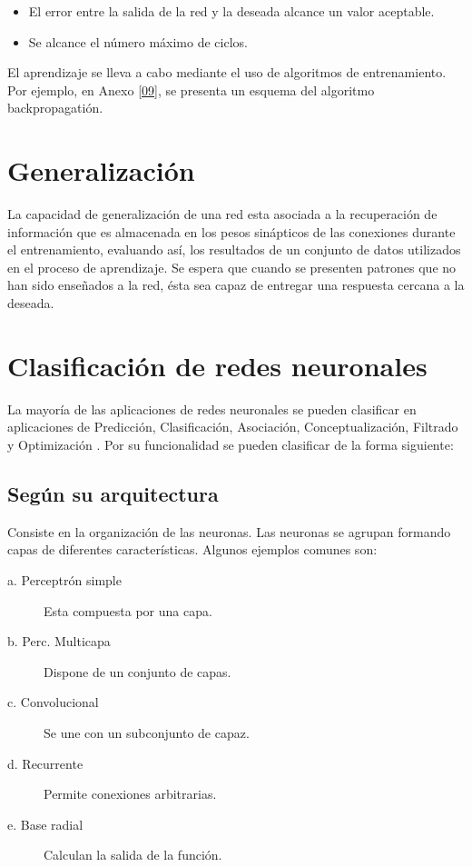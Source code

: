 \documentclass[11pt,titlepage]{report}
\begin{document}
\begin{itemize}
	\item El error entre la salida de la red y la deseada alcance un valor aceptable.
	\item  Se alcance el número máximo de ciclos.
\end{itemize}
	
El aprendizaje se lleva a cabo mediante el uso de algoritmos de entrenamiento. Por ejemplo, en Anexo \ref{09}, se presenta un esquema del algoritmo backpropagatión.


\section{Generalización}
La capacidad de generalización de una red esta asociada a la recuperación de información que es almacenada en los pesos sinápticos de las conexiones durante el entrenamiento, evaluando así, los resultados de un conjunto de datos utilizados en el proceso de aprendizaje. Se espera que cuando se presenten patrones que no han sido enseñados a la red, ésta sea capaz de entregar una respuesta cercana a la deseada. 

\section{Clasificación de redes neuronales}
La mayoría de las aplicaciones de redes neuronales se pueden clasificar en aplicaciones de Predicción, Clasificación, Asociación, Conceptualización, Filtrado y Optimización \cite{Art02}. Por su funcionalidad se pueden clasificar de la forma siguiente:

\subsection{Según su arquitectura}
Consiste en la organización de las neuronas. Las neuronas se agrupan formando capas de diferentes características. Algunos ejemplos comunes son:
\begin{center}
	\begin{description}
		\item[a. Perceptrón simple]  Esta compuesta por una capa.
		\item[b. Perc. Multicapa] Dispone de un conjunto de capas.
		\item[c. Convolucional] Se une con un subconjunto de capaz.
		\item[d. Recurrente] Permite conexiones arbitrarias.
		\item[e. Base radial] Calculan la salida de la función.\\[1cm]
\end{description}
\end{center}
\end{document}
